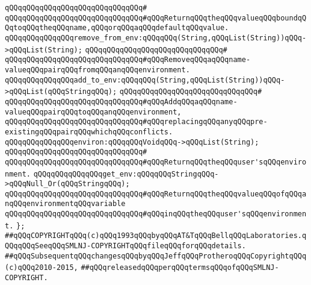 \verb|qQQqqQQqqQQqqQQqqQQqqQQqqQQqqQQq#|\newline
\verb|qQQqqQQqqQQqqQQqqQQqqQQqqQQqqQQq#qQQqReturnqQQqtheqQQqvalueqQQqboundqQQqtoqQQqtheqQQqname,qQQqorqQQqaqQQqdefaultqQQqvalue.|\newline
\newline
\verb|qQQqqQQqqQQqqQQqremove_from_env:qQQqqQQq(String,qQQqList(String))qQQq->qQQqList(String);|\newline
\verb|qQQqqQQqqQQqqQQqqQQqqQQqqQQqqQQq#|\newline
\verb|qQQqqQQqqQQqqQQqqQQqqQQqqQQqqQQq#qQQqRemoveqQQqaqQQqname-valueqQQqpairqQQqfromqQQqanqQQqenvironment.|\newline
\newline
\verb|qQQqqQQqqQQqqQQqadd_to_env:qQQqqQQq(String,qQQqList(String))qQQq->qQQqList(qQQqStringqQQq);|\newline
\verb|qQQqqQQqqQQqqQQqqQQqqQQqqQQqqQQq#|\newline
\verb|qQQqqQQqqQQqqQQqqQQqqQQqqQQqqQQq#qQQqAddqQQqaqQQqname-valueqQQqpairqQQqtoqQQqanqQQqenvironment,|\newline
\verb|qQQqqQQqqQQqqQQqqQQqqQQqqQQqqQQq#qQQqreplacingqQQqanyqQQqpre-existingqQQqpairqQQqwhichqQQqconflicts.|\newline
\newline
\verb|qQQqqQQqqQQqqQQqenviron:qQQqqQQqVoidqQQq->qQQqList(String);|\newline
\verb|qQQqqQQqqQQqqQQqqQQqqQQqqQQqqQQq#|\newline
\verb|qQQqqQQqqQQqqQQqqQQqqQQqqQQqqQQq#qQQqReturnqQQqtheqQQquser'sqQQqenvironment.|\newline
\newline
\verb|qQQqqQQqqQQqqQQqget_env:qQQqqQQqStringqQQq->qQQqNull_Or(qQQqStringqQQq);|\newline
\verb|qQQqqQQqqQQqqQQqqQQqqQQqqQQqqQQq#qQQqReturnqQQqtheqQQqvalueqQQqofqQQqanqQQqenvironmentqQQqvariable|\newline
\verb|qQQqqQQqqQQqqQQqqQQqqQQqqQQqqQQq#qQQqinqQQqtheqQQquser'sqQQqenvironment.|\newline
\verb|};|\newline
\newline
\newline
\newline
\verb|##qQQqCOPYRIGHTqQQq(c)qQQq1993qQQqbyqQQqAT&TqQQqBellqQQqLaboratories.qQQqqQQqSeeqQQqSMLNJ-COPYRIGHTqQQqfileqQQqforqQQqdetails.|\newline
\verb|##qQQqSubsequentqQQqchangesqQQqbyqQQqJeffqQQqProtheroqQQqCopyrightqQQq(c)qQQq2010-2015,|\newline
\verb|##qQQqreleasedqQQqperqQQqtermsqQQqofqQQqSMLNJ-COPYRIGHT.|\newline

